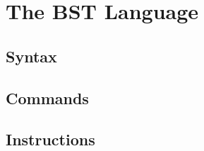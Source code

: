 
\chapter{The BST Language}

\section{Syntax}

\section{Commands}

\section{Instructions}



\endinput
%
